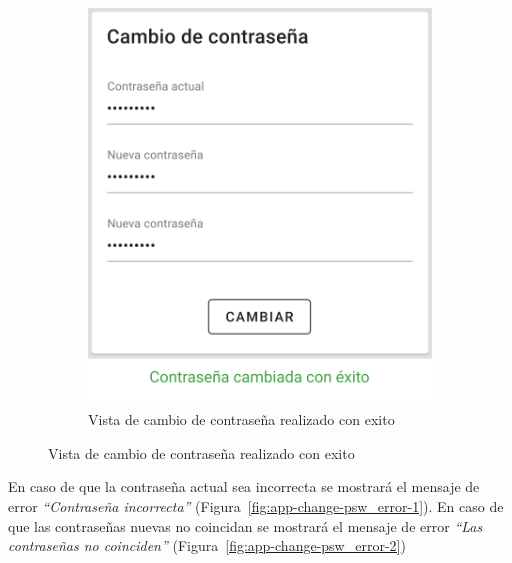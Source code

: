 \begin{figure}[H]
\begin{subfigure}[b]{0.45\textwidth}
        \includegraphics[width=\textwidth]{images/app/change-psw-sucess.png}
        \caption{Vista de cambio de contraseña realizado con exito}
        \label{fig:app-change-psw-success}
    \end{subfigure}
    \label{fig:app-change-psw-1}
\end{figure}
En caso de que la contraseña actual sea incorrecta se mostrará el mensaje de error  \textit{“Contraseña incorrecta”} (Figura~\ref{fig:app-change-psw_error-1}).
En caso de que las contraseñas nuevas no coincidan se mostrará el mensaje de error \textit{“Las contraseñas no coinciden”} (Figura~\ref{fig:app-change-psw_error-2})
